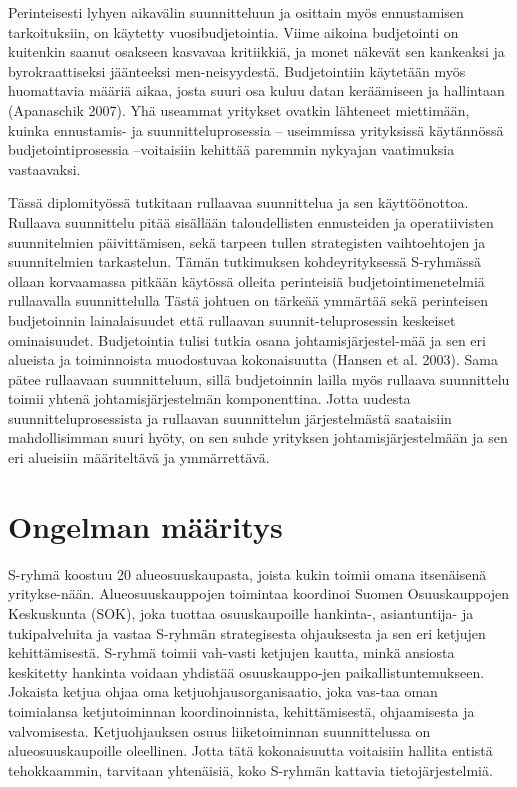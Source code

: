 \documentclass[12pt,a4paper,oneside,pdftex]{report}
\begin{document}
Perinteisesti lyhyen aikavälin suunnitteluun ja osittain myös ennustamisen tarkoituksiin, on käytetty vuosibudjetointia. Viime aikoina budjetointi on kuitenkin saanut osakseen kasvavaa kritiikkiä, ja monet näkevät sen kankeaksi ja byrokraattiseksi jäänteeksi men-neisyydestä. Budjetointiin käytetään myös huomattavia määriä aikaa, josta suuri osa kuluu datan keräämiseen ja hallintaan (Apanaschik 2007). Yhä useammat yritykset ovatkin lähteneet miettimään, kuinka ennustamis- ja suunnitteluprosessia – useimmissa yrityksissä käytännössä budjetointiprosessia –voitaisiin kehittää paremmin nykyajan vaatimuksia vastaavaksi.

Tässä diplomityössä tutkitaan rullaavaa suunnittelua ja sen käyttöönottoa. Rullaava suunnittelu pitää sisällään taloudellisten ennusteiden ja operatiivisten suunnitelmien päivittämisen, sekä tarpeen tullen strategisten vaihtoehtojen ja suunnitelmien tarkastelun. Tämän tutkimuksen kohdeyrityksessä S-ryhmässä ollaan korvaamassa pitkään käytössä olleita perinteisiä budjetointimenetelmiä rullaavalla suunnittelulla Tästä johtuen on tärkeää ymmärtää sekä perinteisen budjetoinnin lainalaisuudet että rullaavan suunnit-teluprosessin keskeiset ominaisuudet. Budjetointia tulisi tutkia osana johtamisjärjestel-mää ja sen eri alueista ja toiminnoista muodostuvaa kokonaisuutta (Hansen et al. 2003). Sama pätee rullaavaan suunnitteluun, sillä budjetoinnin lailla myös rullaava suunnittelu toimii yhtenä johtamisjärjestelmän komponenttina. Jotta uudesta suunnitteluprosessista ja rullaavan suunnittelun järjestelmästä saataisiin mahdollisimman suuri hyöty, on sen suhde yrityksen johtamisjärjestelmään ja sen eri alueisiin määriteltävä ja ymmärrettävä.

\section{Ongelman määritys}

S-ryhmä koostuu 20 alueosuuskaupasta, joista kukin toimii omana itsenäisenä yritykse-nään. Alueosuuskauppojen toimintaa koordinoi Suomen Osuuskauppojen Keskuskunta (SOK), joka tuottaa osuuskaupoille hankinta-, asiantuntija- ja tukipalveluita ja vastaa S-ryhmän strategisesta ohjauksesta ja sen eri ketjujen kehittämisestä. S-ryhmä toimii vah-vasti ketjujen kautta, minkä ansiosta keskitetty hankinta voidaan yhdistää osuuskauppo-jen paikallistuntemukseen. Jokaista ketjua ohjaa oma ketjuohjausorganisaatio, joka vas-taa oman toimialansa ketjutoiminnan koordinoinnista, kehittämisestä, ohjaamisesta ja valvomisesta. Ketjuohjauksen osuus liiketoiminnan suunnittelussa on alueosuuskaupoille oleellinen. Jotta tätä kokonaisuutta voitaisiin hallita entistä tehokkaammin, tarvitaan yhtenäisiä, koko S-ryhmän kattavia tietojärjestelmiä.
\end{document}
